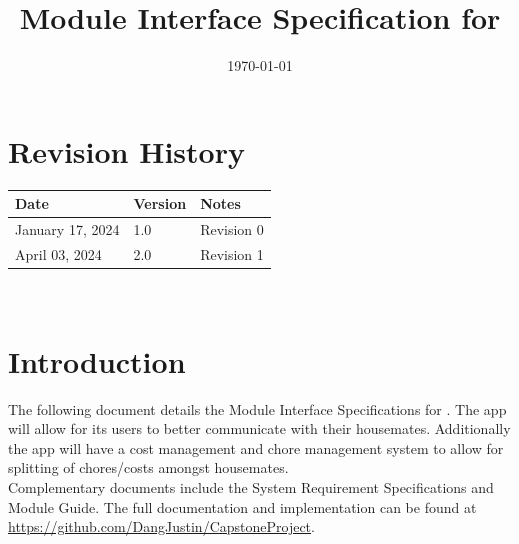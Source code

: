 \documentclass[12pt, titlepage]{article}
\begin{document}
\title{Module Interface Specification for \progname{}}

\author{\authname}

\date{\today}

\maketitle


\section{Revision History}

\begin{tabularx}{\textwidth}{p{3cm}p{2cm}X}
\toprule {\bf Date} & {\bf Version} & {\bf Notes}\\
\midrule
January 17, 2024 & 1.0 & Revision 0\\
April 03, 2024 & 2.0 & Revision 1\\
\bottomrule
\end{tabularx}

~\newpage





\tableofcontents

\newpage


\section{Introduction}

The following document details the Module Interface Specifications for \progname{}. The \progname{} app will allow for its users to better communicate with their housemates.  Additionally the app will have a cost management and chore management system to allow for splitting of chores/costs amongst housemates. \\

Complementary documents include the System Requirement Specifications
and Module Guide.  The full documentation and implementation can be
found at \url{https://github.com/DangJustin/CapstoneProject}.  
\end{document}
